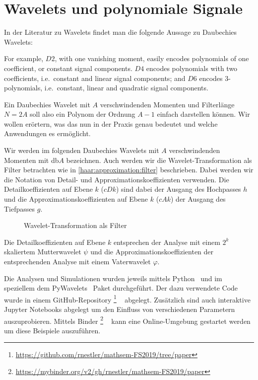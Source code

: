 %
%
%
\chapter{Wavelets und polynomiale Signale\label{chapter:thema}}
\begin{refsection}

In der Literatur zu Wavelets findet man die folgende Aussage zu Daubechies
Wavelets:
\begin{displayquote}
For example, $D2$, with one vanishing moment, easily encodes polynomials of one
coefficient, or constant signal components. $D4$ encodes polynomials with two
coefficients, i.e.\ constant and linear signal components; and $D6$ encodes
3-polynomials, i.e.\ constant, linear and quadratic signal components.
\end{displayquote}
Ein Daubechies Wavelet mit $A$ verschwindenden Momenten und Filterlänge $N=2A$
soll also ein Polynom der Ordnung $A-1$ einfach darstellen können. Wir wollen
erörtern, was das nun in der Praxis genau bedeutet und welche Anwendungen es
ermöglicht.

Wir werden im folgenden Daubechies Wavelets mit $A$ verschwindenden Momenten
mit db$A$ bezeichnen. Auch werden wir die Wavelet-Transformation als Filter
betrachten wie in \autoref{haar:approximation:filter} beschrieben. Dabei werden
wir die Notation von Detail- und Approximationskoeffizienten verwenden. Die
Detailkoeffizienten auf Ebene $k$ ($cDk$) sind dabei der Ausgang des Hochpasses
$h$ und die Approximationskoeffizienten auf Ebene $k$ ($cAk$) der Ausgang des
Tiefpasses $g$.

\begin{figure}
    \centering
    
    \caption{Wavelet-Transformation als Filter\label{polynomials:filter}}
\end{figure}

Die Detailkoeffizienten auf Ebene $k$ entsprechen der Analyse mit einem $2^k$
skaliertem Mutterwavelet $\psi$ und die Approximationskoeffizienten der
entsprechenden Analyse mit einem Vaterwavelet $\varphi$.

Die Analysen und Simulationen wurden jeweils mittels Python~\cite{python} und im
speziellem dem PyWavelets~\cite{gregory_r_lee_2019_2634243} Paket durchgeführt.
Der dazu verwendete Code wurde in einem GitHub-Repository%
\footnote{\url{https://github.com/rnestler/mathsem-FS2019/tree/paper}}%
~\cite{polynomials:repo}
abgelegt. Zusätzlich sind auch interaktive Jupyter Notebooks abgelegt um den
Einfluss von verschiedenen Parametern auszuprobieren. Mittels
Binder%
\footnote{\url{https://mybinder.org/v2/gh/rnestler/mathsem-FS2019/paper}}%
~\cite{project_jupyter-proc-scipy-2018}
kann eine Online-Umgebung gestartet werden um diese Beispiele auszuführen.


\end{refsection}

